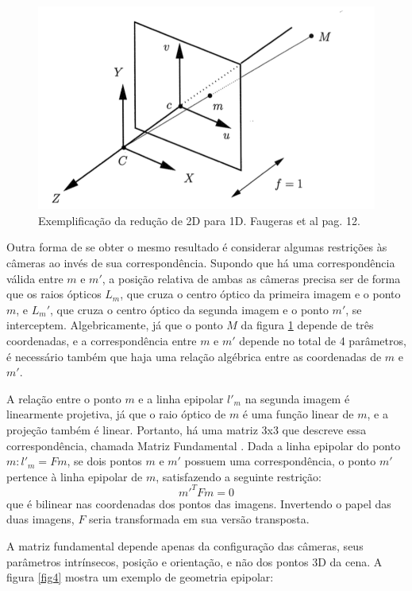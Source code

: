 \begin{figure}[H]
	\centering
		\includegraphics{Imagens/figura2-3.png}
	\caption{Exemplificação da redução de 2D para 1D. Faugeras et al \cite{Faugeras-Geometry} pag. 12.}
	\label{fig3}
\end{figure}

Outra forma de se obter o mesmo resultado é considerar algumas restrições às câmeras ao invés de sua correspondência. Supondo que há uma correspondência válida entre $m$ e $m'$, a posição relativa de ambas as câmeras precisa ser de forma que os raios ópticos $L_{m}$, que cruza o centro óptico da primeira imagem e o ponto $m$, e $L_{m}'$, que cruza o centro óptico da segunda imagem e o ponto $m'$, se interceptem. Algebricamente, já que o ponto $M$ da figura \ref{fig3} depende de três coordenadas, e a correspondência entre $m$ e $m'$ depende no total de 4 parâmetros, é necessário também que haja uma relação algébrica entre as coordenadas de $m$ e $m'$.

A relação entre o ponto $m$ e a linha epipolar $l'_{m}$ na segunda imagem é linearmente projetiva, já que o raio óptico de $m$ é uma função linear de $m$, e a projeção também é linear. Portanto, há uma matriz 3x3 que descreve essa correspondência, chamada Matriz Fundamental \cite{Faugeras-Geometry}. Dada a linha epipolar do ponto $m: l'_{m} = Fm$, se dois pontos $m$ e $m'$ possuem uma correspondência, o ponto $m'$ pertence à linha epipolar de $m$, satisfazendo a seguinte restrição: 
\begin{equation}\label{eq5}m'^{T}Fm = 0\end{equation} que é bilinear nas coordenadas dos pontos das imagens. Invertendo o papel das duas imagens, $F$ seria transformada em sua versão transposta.

A matriz fundamental depende apenas da configuração das câmeras, seus parâmetros intrínsecos, posição e orientação, e não dos pontos 3D da cena. A figura \ref{fig4} mostra um exemplo de geometria epipolar:

